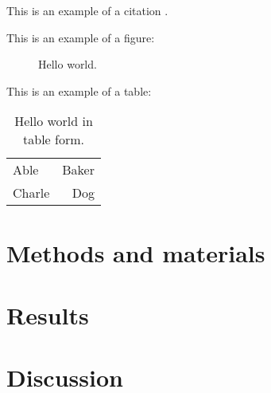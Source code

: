 \documentclass{amsart}
\begin{document}
This is an example of a citation \cite{Allain:2010, Akaike:1974, R:2011}.

This is an example of a figure:
\begin{figure}
\caption{Hello world.}
\label{fig:hello}
\end{figure}

This is an example of a table:
\begin{table}
\caption{Hello world in table form.}
\label{tab:hello}
\begin{tabular}{lr}
Able & Baker \\
Charle & Dog \\
\end{tabular}
\end{table}




\section{Methods and materials}
\section{Results}
\section{Discussion}



\end{document}
